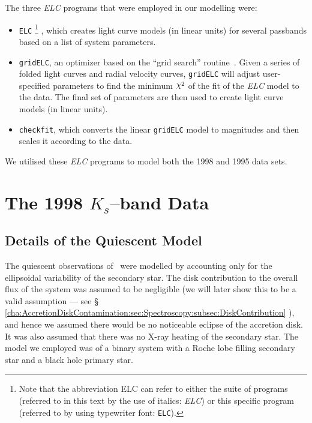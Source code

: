 \vspace{\myparskip}

The three \textit{ELC} programs that were employed in our modelling were:

\begin{itemize}

\item \texttt{ELC}%
\footnote{\label{cha:ELC:sec:IntroductionELC:foot:ELCabbrev}
Note that the abbreviation ELC can refer to either the suite of
programs (referred to in this text by the use of italics:
\textit{ELC}) or this specific program (referred to by using typewriter
font: \texttt{ELC}). }%
, which creates light curve models (in linear units) for several passbands
based on a list of system parameters. %

\item \mbox{\texttt{gridELC}}, an optimizer based on the ``grid search''
routine~\cite{Bevington:1969}. Given a series of folded light curves and radial velocity curves,
\mbox{\texttt{gridELC}} will adjust user-specified parameters to find the
minimum $\Chi^2$ of the fit of the \textit{ELC} model to the data. The
final set of parameters are then used to create light curve models
(in linear units).

\item \mbox{\texttt{checkfit}}, which converts the linear
\texttt{gridELC} model to magnitudes and then scales it according to the
data. %

\end{itemize}

We utilised these \textit{ELC} programs to model both the 1998 and
1995 data sets. %


\section{The 1998 $K_s$--band Data}\label{cha:ELC:sec:1998Results}


\subsection{Details of the Quiescent Model}\label{cha:ELC:sec:1998Results:subsec:model}

The quiescent observations of \groj\ were modelled by accounting only
for the ellipsoidal variability of the secondary star. The disk contribution to
the overall flux of the system was assumed to be negligible (we will later show this to
be a valid assumption --- see \S~%
\vref{cha:AccretionDiskContamination:sec:Spectroscopy:subsec:DiskContribution}%
), and hence we assumed there would be no noticeable eclipse of the
accretion disk. It was also assumed that there was no X-ray heating of
the secondary star. The model we employed was of a binary system
with a Roche lobe filling secondary star and a black hole primary
star. %

